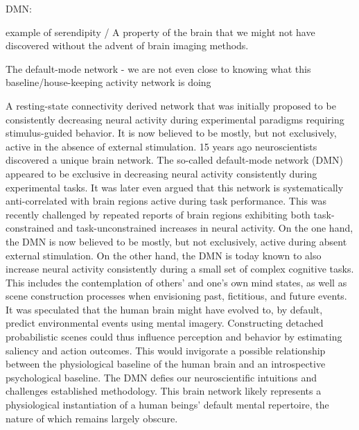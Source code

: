 \documentclass[authoryear,review,3p]{elsarticle}
\begin{document}
DMN:

example of serendipity / A property of the brain that we might not have
discovered without the advent of brain imaging methods.

The default-mode network - we are not even close to knowing
what this baseline/house-keeping activity network is doing

A resting-state connectivity derived network that was initially proposed to be consistently decreasing neural activity during experimental paradigms requiring stimulus-guided behavior. It is now believed to be mostly, but not exclusively, active in the absence of external stimulation. 
15 years ago neuroscientists discovered a unique brain network. The so-called default-mode network (DMN) appeared to be exclusive in decreasing neural activity consistently during experimental tasks.
It was later even argued that this network is systematically anti-correlated with brain regions active during task performance. This was recently challenged by repeated reports of brain regions exhibiting both task-constrained and task-unconstrained increases in neural activity. On the one hand, the DMN is now believed to be mostly, but not exclusively, active during absent external stimulation. On the other hand, the DMN is today known to also increase neural activity consistently during a small set of complex cognitive tasks. This includes the contemplation of others’ and one’s own mind states, as well as scene construction processes when envisioning past, fictitious, and future events. It was speculated that the human brain might have evolved to, by default, predict environmental events using mental imagery. Constructing detached probabilistic scenes could thus influence perception and behavior by estimating saliency and action outcomes. This would invigorate a possible relationship between the physiological baseline of the human brain and an introspective psychological baseline.
The DMN defies our neuroscientific intuitions and challenges established methodology. This brain network likely represents a physiological instantiation of a human beings' default mental repertoire, the nature of which remains largely obscure.
\end{document}
